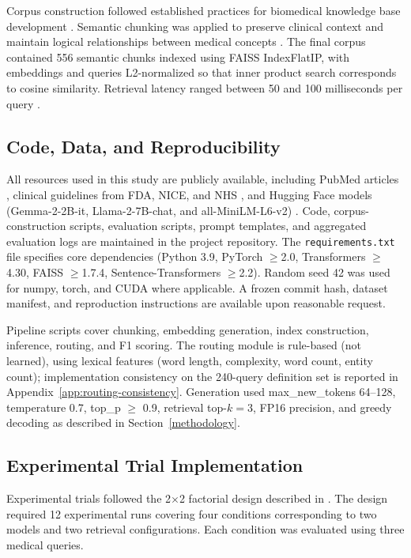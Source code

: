 Corpus construction followed established practices for biomedical knowledge base development \cite{pezoulas2023generative, zamzmi2025smd}. Semantic chunking was applied to preserve clinical context and maintain logical relationships between medical concepts \cite{alsentzer2019clinicalbert}. The final corpus contained 556 semantic chunks indexed using FAISS IndexFlatIP, with embeddings and queries L2-normalized so that inner product search corresponds to cosine similarity. Retrieval latency ranged between 50 and 100 milliseconds per query \cite{zakka2023retrieval}.
 
\subsection{Code, Data, and Reproducibility}
 
All resources used in this study are publicly available, including PubMed articles \cite{krithara2023bioasq}, clinical guidelines from FDA, NICE, and NHS \cite{labkoff2024aicds}, and Hugging Face models (Gemma-2-2B-it, Llama-2-7B-chat, and all-MiniLM-L6-v2) \cite{xiong2024rag, lee2020biobert}. Code, corpus-construction scripts, evaluation scripts, prompt templates, and aggregated evaluation logs are maintained in the project repository. The \texttt{requirements.txt} file specifies core dependencies (Python 3.9, PyTorch $\geq$2.0, Transformers $\geq$4.30, FAISS $\geq$1.7.4, Sentence-Transformers $\geq$2.2). Random seed 42 was used for numpy, torch, and CUDA where applicable. A frozen commit hash, dataset manifest, and reproduction instructions are available upon reasonable request.

Pipeline scripts cover chunking, embedding generation, index construction, inference, routing, and F1 scoring. The routing module is rule-based (not learned), using lexical features (word length, complexity, word count, entity count); implementation consistency on the 240-query definition set is reported in Appendix~\ref{app:routing-consistency}. Generation used max\_new\_tokens 64--128, temperature 0.7, top\_p $\geq$ 0.9, retrieval top-$k=3$, FP16 precision, and greedy decoding as described in Section~\ref{methodology}.

\subsection{Experimental Trial Implementation}
 
Experimental trials followed the 2$\times$2 factorial design described in \cite{tam2024quest}. The design required 12 experimental runs covering four conditions corresponding to two models and two retrieval configurations. Each condition was evaluated using three medical queries.
 
